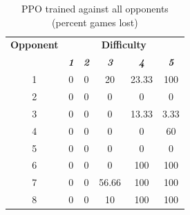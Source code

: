 \documentclass[conference]{IEEEtran}
\begin{document}
    \begin{table}[htbp]
        \caption{PPO trained against all opponents (percent games lost)}
        \begin{center}
            \begin{tabular}{|c|c|c|c|c|c|}
                \hline
                \textbf{Opponent} & \multicolumn{5}{|c|}{\textbf{Difficulty}} \\
                \cline{2-6}
                & \textbf{\textit{1}} & \textbf{\textit{2}} & \textbf{\textit{3}} & \textbf{\textit{4}} & \textbf{\textit{5}} \\
                \hline
                1 & 0                   & 0                   & 20                  & 23.33               & 100                 \\
                2 & 0                   & 0                   & 0                   & 0                   & 0                   \\
                3 & 0                   & 0                   & 0                   & 13.33               & 3.33                \\
                4 & 0                   & 0                   & 0                   & 0                   & 60                  \\
                5 & 0                   & 0                   & 0                   & 0                   & 0                   \\
                6 & 0                   & 0                   & 0                   & 100                 & 100                 \\
                7 & 0                   & 0                   & 56.66               & 100                 & 100                 \\
                8 & 0                   & 0                   & 10                  & 100                 & 100                 \\
                \hline
            \end{tabular}
            \label{PPO against all opponents games lost}
        \end{center}
    \end{table}
\end{document}
